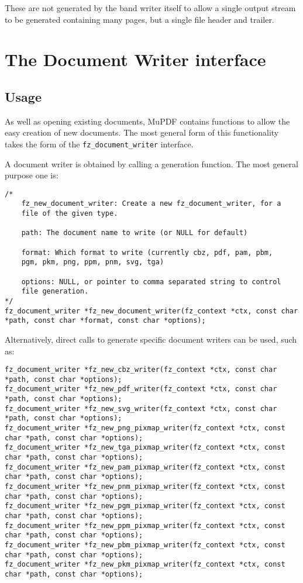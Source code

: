 \documentclass[oneside]{book}
\begin{document}
These are not generated by the band writer itself to allow a single output stream to be generated containing many pages, but a single file header and trailer.

\chapter{The Document Writer interface}
\label{DocumentWriter}

\section{Usage}

As well as opening existing documents, MuPDF contains functions to allow the easy creation of new documents. The most general form of this functionality takes the form of the \texttt{fz\_document\_writer} interface.

A document writer is obtained by calling a generation function. The most general purpose one is:

\begin{lstlisting}
/*
	fz_new_document_writer: Create a new fz_document_writer, for a
	file of the given type.

	path: The document name to write (or NULL for default)

	format: Which format to write (currently cbz, pdf, pam, pbm,
	pgm, pkm, png, ppm, pnm, svg, tga)

	options: NULL, or pointer to comma separated string to control
	file generation.
*/
fz_document_writer *fz_new_document_writer(fz_context *ctx, const char *path, const char *format, const char *options);
\end{lstlisting}

Alternatively, direct calls to generate specific document writers can be used, such as:

\begin{lstlisting}
fz_document_writer *fz_new_cbz_writer(fz_context *ctx, const char *path, const char *options);
fz_document_writer *fz_new_pdf_writer(fz_context *ctx, const char *path, const char *options);
fz_document_writer *fz_new_svg_writer(fz_context *ctx, const char *path, const char *options);
fz_document_writer *fz_new_png_pixmap_writer(fz_context *ctx, const char *path, const char *options);
fz_document_writer *fz_new_tga_pixmap_writer(fz_context *ctx, const char *path, const char *options);
fz_document_writer *fz_new_pam_pixmap_writer(fz_context *ctx, const char *path, const char *options);
fz_document_writer *fz_new_pnm_pixmap_writer(fz_context *ctx, const char *path, const char *options);
fz_document_writer *fz_new_pgm_pixmap_writer(fz_context *ctx, const char *path, const char *options);
fz_document_writer *fz_new_ppm_pixmap_writer(fz_context *ctx, const char *path, const char *options);
fz_document_writer *fz_new_pbm_pixmap_writer(fz_context *ctx, const char *path, const char *options);
fz_document_writer *fz_new_pkm_pixmap_writer(fz_context *ctx, const char *path, const char *options);
\end{lstlisting}
\end{document}
